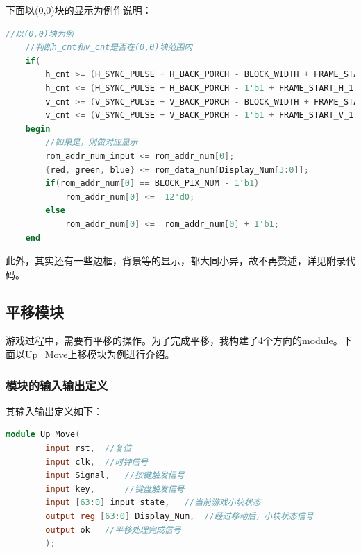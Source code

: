 \documentclass[UTF8]{article}
\newcommand{\jumpline} {\hspace*{\fill} \par}
\begin{document}
	下面以(0,0)块的显示为例作说明：\par
	\begin{lstlisting}[language=Verilog, name=各个小块的显示]
	//以(0,0)块为例
	//判断h_cnt和v_cnt是否在(0,0)块范围内
	if(
		h_cnt >= (H_SYNC_PULSE + H_BACK_PORCH - BLOCK_WIDTH + FRAME_START_H_1) &&
		h_cnt <= (H_SYNC_PULSE + H_BACK_PORCH - 1'b1 + FRAME_START_H_1) && 
		v_cnt >= (V_SYNC_PULSE + V_BACK_PORCH - BLOCK_WIDTH + FRAME_START_V_1) &&
		v_cnt <= (V_SYNC_PULSE + V_BACK_PORCH - 1'b1 + FRAME_START_V_1))
	begin
		//如果是，则做对应显示
		rom_addr_num_input <= rom_addr_num[0];
		{red, green, blue} <= rom_data_num[Display_Num[3:0]];
		if(rom_addr_num[0] == BLOCK_PIX_NUM - 1'b1) 
			rom_addr_num[0] <=  12'd0;
		else 
			rom_addr_num[0] <=  rom_addr_num[0] + 1'b1;
	end
	\end{lstlisting}\par
	\jumpline
	此外，其实还有一些边框，背景等的显示，都大同小异，故不再赘述，详见附录代码。\par
	
	\subsection{平移模块}
	游戏过程中，需要有平移的操作。为了完成平移，我构建了4个方向的module。下面以Up\_Move上移模块为例进行介绍。\par
	\subsubsection{模块的输入输出定义}
	其输入输出定义如下：\par
	\begin{lstlisting}[language=Verilog, name=平移模块输入输出定义]
	module Up_Move(
		input rst,	//复位
		input clk,	//时钟信号
		input Signal,	//按键触发信号
		input key,		//键盘触发信号
		input [63:0] input_state,	//当前游戏小块状态
		output reg [63:0] Display_Num,	//经过移动后，小块状态信号
		output ok	//平移处理完成信号
		);
	\end{lstlisting}\par
\end{document}
